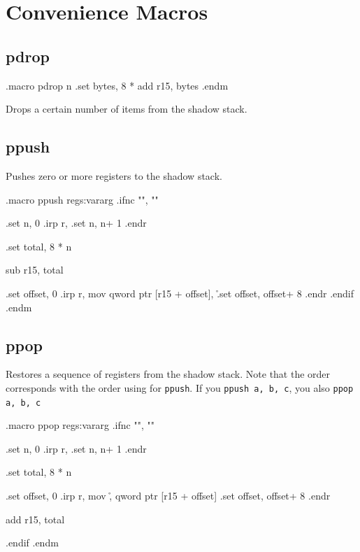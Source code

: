 \section{Convenience Macros}

\subsection{pdrop}

\begin{asm}
.macro pdrop n
	.set bytes, 8 * \n
	add	r15, bytes
.endm
\end{asm}

Drops a certain number of items from the shadow stack.

\subsection{ppush}

Pushes zero or more registers to the shadow stack.

\begin{asm}
.macro ppush regs:vararg
	.ifnc "\regs", ""

	.set n\@, 0
	.irp r, \regs
	.set n\@, n\@ + 1
	.endr

	.set total, 8 * n\@

	sub     r15, total

	.set offset\@, 0
	.irp r, \regs
		mov	qword ptr [r15 + offset\@], \r
		.set offset\@, offset\@ + 8
	.endr
	.endif
.endm
\end{asm}

\subsection{ppop}

Restores a sequence of registers from the shadow stack.  Note that the
order corresponds with the order using for \lstinline|ppush|.  If you
\lstinline|ppush a, b, c|, you also \lstinline|ppop a, b, c|

\begin{asm}
.macro ppop regs:vararg
	.ifnc "\regs", ""

	.set n\@, 0
	.irp r, \regs
	.set n\@, n\@ + 1
	.endr

	.set total, 8 * n\@

	.set offset\@, 0
	.irp r, \regs
		mov	\r, qword ptr [r15 + offset\@]
		.set offset\@, offset\@ + 8
	.endr

	add     r15, total

	.endif
.endm
\end{asm}

